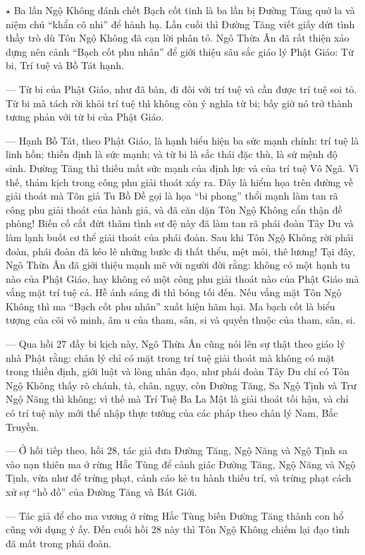 $\star$ Ba lần Ngộ Không đánh chết Bạch cốt tinh là ba lần bị Đường Tăng quở la và niệm chú ``khẩn cô nhi'' để hành hạ. Lần cuối thì Đường Tăng viết giấy dứt tình thầy trò dù Tôn Ngộ Không đã cạn lời phân tỏ. Ngô Thừa Ân đã rất thiện xảo dựng nên cảnh ``Bạch cốt phu nhân'' để giới thiệu sâu sắc giáo lý Phật Giáo: Từ bi, Trí tuệ và Bồ Tát hạnh.

— Từ bi của Phật Giáo, như đã bàn, đi đôi với trí tuệ và cần được trí tuệ soi tỏ. Từ bi mà tách rời khỏi trí tuệ thì không còn ý nghĩa từ bi; bấy giờ nó trở thành tương phản với từ bi của Phật Giáo.

— Hạnh Bồ Tát, theo Phật Giáo, là hạnh biểu hiện ba sức mạnh chính: trí tuệ là linh hồn; thiền định là sức mạnh; và từ bi là sắc thái đặc thù, là sứ mệnh độ sinh. Đường Tăng thì thiếu mất sức mạnh của định lực và của trí tuệ Vô Ngã. Vì thế, thảm kịch trong công phu giải thoát xẩy ra. Đây là hiểm họa trên đường về giải thoát mà Tôn giả Tu Bồ Đề gọi là họa ``bi phong'' thổi mạnh làm tan rã công phu giải thoát của hành giả, và đã căn dặn Tôn Ngộ Không cẩn thận đề phòng! Biến cố cắt đứt thâm tình sư đệ này đã làm tan rã phái đoàn Tây Du và làm lạnh buốt cơ thể giải thoát của phái đoàn. Sau khi Tôn Ngộ Không rời phái đoàn, phái đoàn đã kéo lê những bước đi thất thểu, mệt mỏi, thê lương! Tại đây, Ngô Thừa Ân đã giới thiệu mạnh mẽ với người đời rằng: không có một hạnh tu nào của Phật Giáo, hay không có một công phu giải thoát nào của Phật Giáo mà vắng mặt trí tuệ cả. Hễ ánh sáng đi thì bóng tối đến. Nếu vắng mặt Tôn Ngộ Không thì ma ``Bạch cốt phu nhân'' xuất hiện hãm hại. Ma bạch cốt là biểu tượng của cõi vô minh, âm u của tham, sân, si và quyến thuộc của tham, sân, si.

— Qua hồi 27 đầy bi kịch này, Ngô Thừa Ân cũng nói lên sự thật theo giáo lý nhà Phật rằng: chân lý chỉ có mặt trong trí tuệ giải thoát mà không có mặt trong thiền định, giới luật và lòng nhân đạo, như phái đoàn Tây Du chỉ có Tôn Ngộ Không thấy rõ chánh, tà, chân, ngụy, còn Đường Tăng, Sa Ngộ Tịnh và Trư Ngộ Năng thì không; vì thế mà Trí Tuệ Ba La Mật là giải thoát tối hậu, và chỉ có trí tuệ này mới thể nhập thực tướng của các pháp theo chân lý Nam, Bắc Truyền.

— Ở hồi tiếp theo, hồi 28, tác giả đưa Đường Tăng, Ngộ Năng và Ngộ Tịnh sa vào nạn thiên ma ở rừng Hắc Tùng để cảnh giác Đường Tăng, Ngộ Năng và Ngộ Tịnh, vừa như để trừng phạt, cảnh cáo kẻ tu hành thiếu trí, và trừng phạt cách xử sự ``hồ đồ'' của Đường Tăng và Bát Giới.

— Tác giả để cho ma vương ở rừng Hắc Tùng biến Đường Tăng thành con hổ cũng với dụng ý ấy. Đến cuối hồi 28 này thì Tôn Ngộ Không chiếm lại đạo tình đã mất trong phái đoàn.

